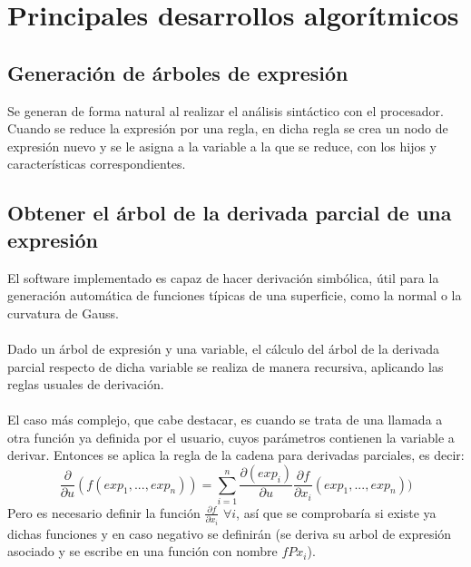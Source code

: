 \section{Principales desarrollos algorítmicos}

\subsection*{Generación de árboles de expresión}
Se generan de forma natural al realizar el análisis sintáctico con el procesador. Cuando se reduce la expresión por una regla, en dicha regla se crea un nodo de expresión nuevo y se le asigna a la variable a la que se reduce, con los hijos y características correspondientes.

\subsection*{Obtener el árbol de la derivada parcial de una expresión}
El software implementado es capaz de hacer derivación simbólica, útil para la generación automática de funciones típicas de una superficie, como la normal o la curvatura de Gauss.\\
\\Dado un árbol de expresión y una variable, el cálculo del árbol de la derivada parcial respecto de dicha variable se realiza de manera recursiva, aplicando las reglas usuales de derivación. \\
\\El caso más complejo, que cabe destacar, es cuando se trata de una llamada a otra función ya definida por el usuario, cuyos parámetros contienen la variable a derivar. Entonces se aplica la regla de la cadena para derivadas parciales, es decir:
$$\frac{\partial}{\partial u}(f(exp_1, ..., exp_n)) = \sum_{i=1}^{n} \frac{\partial (exp_i)}{\partial u} \frac{\partial f}{\partial x_i}(exp_1, ..., exp_n))$$
Pero es necesario definir la función $\frac{\partial f}{\partial x_i}$ $\forall i$, así que se comprobaría si existe ya dichas funciones y en caso negativo se definirán (se deriva su arbol de expresión asociado y se escribe en una función con nombre $fPx_i$).

